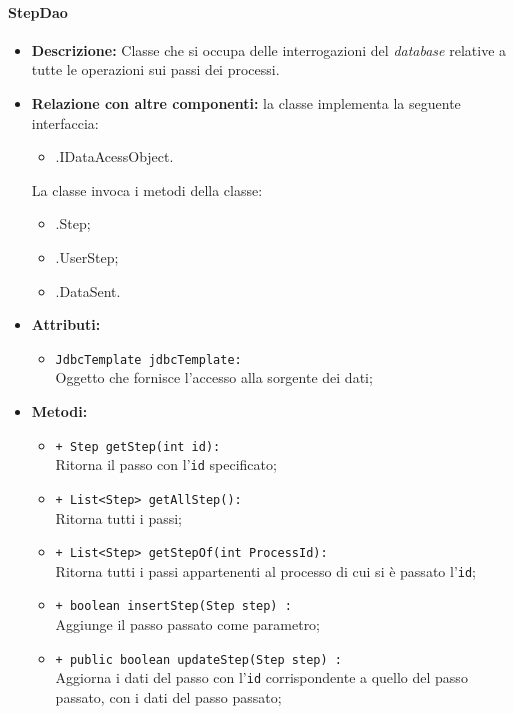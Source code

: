 \paragraph{StepDao}
\label{stepdao}
\begin{flushleft}
\begin{itemize}
\item \textbf{Descrizione:} Classe che si occupa delle interrogazioni del \textit{database} relative a tutte le operazioni sui passi dei processi.
\item \textbf{Relazione con altre componenti:} la classe implementa la seguente interfaccia:
		\begin{itemize}
			\item \smodel{}.IDataAcessObject.
		\end{itemize}
		La classe invoca i metodi della classe:
		\begin{itemize}
			\item \smodel{}.Step;
			\item \smodel{}.UserStep;
			\item \smodel{}.DataSent.
		\end{itemize}
\item \textbf{Attributi:}
\begin{sloppypar}
\begin{itemize}
\item \texttt{JdbcTemplate jdbcTemplate:}\\ Oggetto che fornisce l'accesso alla sorgente dei dati;
\end{itemize}
\end{sloppypar}
\item \textbf{Metodi:}
\begin{sloppypar}
\begin{itemize}
\item \texttt{+ Step getStep(int id):}\\ Ritorna il passo con l'\texttt{id} specificato; 
\item \texttt{+ List<Step> getAllStep():}\\ Ritorna tutti i passi;
\item \texttt{+ List<Step> getStepOf(int ProcessId):}\\ Ritorna tutti i passi appartenenti al processo di cui si è passato l'\texttt{id};
\item \texttt{+ boolean insertStep(Step step) :}\\ Aggiunge il passo passato come parametro;
\item \texttt{+ public boolean updateStep(Step step) :}\\ Aggiorna i dati del passo con l'\texttt{id} corrispondente a quello del passo passato, con i dati del passo passato;

\end{itemize}
\end{sloppypar}
\end{itemize}
\end{flushleft}
